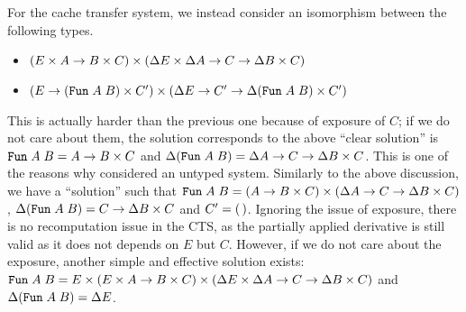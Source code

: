 \documentclass{article}
\theoremstyle{definition}
\begin{document}
For the cache transfer system, we instead consider an isomorphism between the following types. 
\begin{itemize}
 \item 
   \( (E \times A \to B \times C ) \times ( \Delta E \times \Delta A \to C \to \Delta B \times C) \)
 \item 
   \( 
      (E \to (\texttt{Fun} \; A \; B) \times C') \times (\Delta E \to C' \to \Delta (\texttt{Fun} \; A \; B) \times C')
   \) 
\end{itemize}
This is actually harder than the previous one because of exposure of $C$; if we do not care about them, the solution corresponds to the above ``clear solution'' is 
$\texttt{Fun} \; A \; B = A \to B \times C$ and $\Delta (\texttt{Fun} \; A \; B) = \Delta A \to C \to \Delta B \times C$. This is one of the reasons why \citet{GiarrussoRS19} considered an untyped system. 
Similarly to the above discussion, we have a ``solution'' such that $\texttt{Fun} \; A \; B = (A \to B \times C) \times (\Delta A \to C \to \Delta B \times C)$, 
$\Delta (\texttt{Fun} \; A \; B) = C \to \Delta B \times C$ and $C' = (\,)$. 
Ignoring the issue of exposure, there is no recomputation issue in the CTS, as the partially applied derivative is still valid as it does not depends on $E$ but $C$. 
However, if we do not care about the exposure, another simple and effective solution exists: 
$\texttt{Fun} \; A \; B = E \times (E \times A \to B \times C) \times ( \Delta E \times \Delta A \to C \to \Delta B \times C)$ and 
$\Delta (\texttt{Fun} \; A \; B) = \Delta E$.
\end{document}
